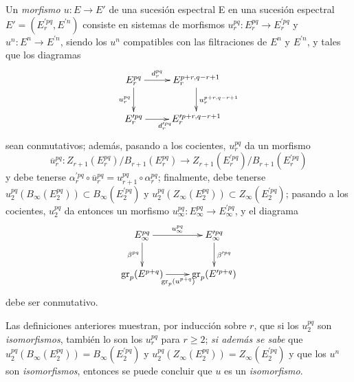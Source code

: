 \begin{env}[11.1.2]
\label{0.11.1.2}
\label{0.11.1.2-fr}
Un \emph{morfismo $u:E\to E'$} de una sucesión espectral E en una sucesión espectral $E'=(E_r^{\prime pq},E^{\prime n})$ consiste en sistemas de morfismos $u_r^{pq}:E_r^{pq}\to E_r^{\prime pq}$ y $u^n:E^n\to E^{\prime n}$, siendo los $u^n$ compatibles con las filtraciones de $E^n$ y $E^{\prime n}$, y tales que los diagramas
\[
  \xymatrix{
    E_r^{pq}\ar[r]^-{d_r^{pq}}\ar[d]_{u_r^{pq}} &
    E_r^{p+r,q-r+1}\ar[d]^{u_r^{p+r,q-r+1}}\\
    E_r^{\prime pq}\ar[r]_{d_r^{\prime pq}} &
    E_r^{\prime p+r,q-r+1}
  }
\]
sean conmutativos; además, pasando a los cocientes, $u_r^{pq}$ da un morfismo \[
  \overline u_r^{pq}:
  Z_{r+1}(E_r^{pq})/B_{r+1}(E_r^{pq})\longrightarrow
  Z_{r+1}(E_r^{\prime pq})/B_{r+1}(E_r^{\prime pq})
\] y debe tenerse $\alpha_r^{\prime pq}\circ\overline u_r^{pq}
=u_{r+1}^{pq}\circ\alpha_r^{pq}$; finalmente, debe tenerse $u_2^{pq}(B_\infty(E_2^{pq}))\subset B_\infty(E_2^{\prime pq})$ y $u_2^{pq}(Z_\infty(E_2^{pq}))\subset Z_\infty(E_2^{\prime pq})$; pasando a los cocientes, $u_2^{pq}$ da entonces un morfismo $u_\infty^{pq}:E_\infty^{pq}\to E_\infty^{\prime pq}$, y el diagrama
\[
  \xymatrix{
    E_\infty^{pq}\ar[r]^-{u_\infty^{pq}}\ar[d]_{\beta^{pq}} &
    E_\infty^{\prime pq}\ar[d]^{\beta^{\prime pq}}\\
    \operatorname{gr}_p(E^{p+q})
      \ar[r]_{\operatorname{gr}_p(u^{p+q})} &
    \operatorname{gr}_p(E^{\prime p+q})
  }
\]
debe ser conmutativo.

Las definiciones anteriores muestran, por inducción sobre $r$, que si los $u_2^{pq}$ son \emph{isomorfismos}, también lo son los $u_r^{pq}$ para $r\geq2$; \emph{si además se sabe} que $u_2^{pq}(B_\infty(E_2^{pq}))=B_\infty(E_2^{\prime pq})$ y $u_2^{pq}(Z_\infty(E_2^{pq}))=Z_\infty(E_2^{\prime pq})$ y que los $u^n$ son \emph{isomorfismos}, entonces se puede concluir que $u$ es un \emph{isomorfismo}.
\end{env}

